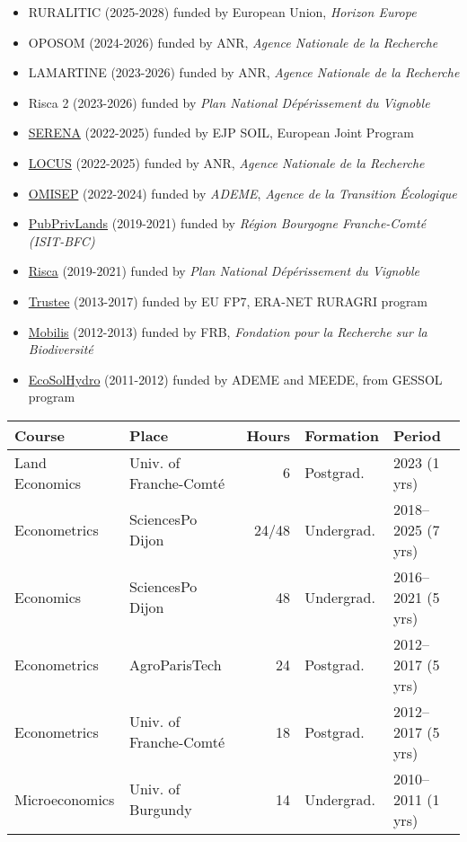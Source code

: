 \documentclass[11pt, a4paper]{./style}
\begin{document}
\begin{itemize}
\item RURALITIC (2025-2028) funded by European Union, \emph{Horizon Europe}
\item OPOSOM (2024-2026) funded by ANR, \emph{Agence Nationale de la
Recherche}
\item LAMARTINE (2023-2026) funded by ANR, \emph{Agence Nationale de la
Recherche}
\item Risca 2 (2023-2026) funded by \emph{Plan National Dépérissement du
Vignoble}
\item \href{https://ejpsoil.eu/soil-research/serena}{SERENA} (2022-2025) funded by EJP SOIL, European Joint Program
\item \href{https://anr.fr/Project-ANR-21-CE03-0007}{LOCUS} (2022-2025) funded by ANR, \emph{Agence Nationale de la
Recherche}
\item \href{https://www.ademe.fr/en/frontpage/}{OMISEP} (2022-2024) funded by \emph{ADEME}, \emph{Agence de la Transition
Écologique}
\item \href{http://www.ubfc.fr/pubprivlands/}{PubPrivLands} (2019-2021) funded by \emph{Région Bourgogne
Franche-Comté (ISIT-BFC)}
\item \href{https://www.plan-deperissement-vigne.fr/travaux-de-recherche/programmes-de-recherche/risca}{Risca} (2019-2021) funded by \emph{Plan National Dépérissement du
Vignoble}
\item \href{https://www.trustee-project.eu/}{Trustee} (2013-2017) funded by EU FP7, ERA-NET RURAGRI program
\item \href{https://www.fondationbiodiversite.fr/en/}{Mobilis} (2012-2013) funded by FRB, \emph{Fondation pour la Recherche
sur la Biodiversité}
\item \href{http://www.gessol.fr/content/integrer-la-valeur-epuratrice-de-sols-hydromorphes-dans-leur-usage-quelles-strategies-d-inte}{EcoSolHydro} (2011-2012) funded by ADEME and MEEDE, from GESSOL
program
\end{itemize}

\label{sec:org4e908aa}

\begin{center}
\begin{tabular}{llrll}
\textbf{Course} & \textbf{Place} & \textbf{Hours} & \textbf{Formation} & \textbf{Period}\\[0pt]
\hline
Land Economics & Univ. of Franche-Comté & 6 & Postgrad. & 2023 (1 yrs)\\[0pt]
Econometrics & SciencesPo Dijon & 24/48 & Undergrad. & 2018--2025 (7 yrs)\\[0pt]
Economics & SciencesPo Dijon & 48 & Undergrad. & 2016--2021 (5 yrs)\\[0pt]
Econometrics & AgroParisTech & 24 & Postgrad. & 2012--2017 (5 yrs)\\[0pt]
Econometrics & Univ. of Franche-Comté & 18 & Postgrad. & 2012--2017 (5 yrs)\\[0pt]
Microeconomics & Univ. of Burgundy & 14 & Undergrad. & 2010--2011 (1 yrs)\\[0pt]
\hline
\end{tabular}
\end{center}
\end{document}
